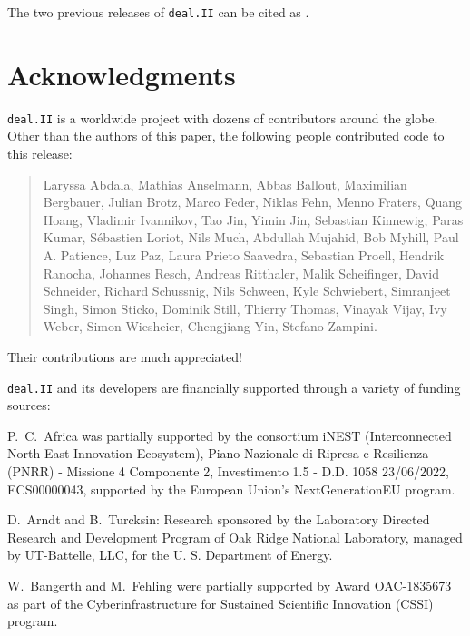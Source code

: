 \documentclass{ansarticle-preprint}
\newcommand{\specialword}[1]{\texttt{#1}}
\newcommand{\dealii}{{\specialword{deal.II}}\xspace}
\begin{document}
The two previous releases of \dealii can be cited as
\cite{dealII92,dealII93}.


\section{Acknowledgments}

\dealii is a worldwide project with dozens of contributors around the
globe. Other than the authors of this paper, the following people
contributed code to this release:\\

\begin{quote}
Laryssa      Abdala,
Mathias      Anselmann,
Abbas        Ballout,
Maximilian   Bergbauer,
Julian       Brotz,
Marco        Feder,
Niklas       Fehn,
Menno        Fraters,
Quang        Hoang,
Vladimir     Ivannikov,
Tao          Jin,
Yimin        Jin,
Sebastian    Kinnewig,
Paras        Kumar,
Sébastien    Loriot,
Nils         Much,
Abdullah     Mujahid,
Bob          Myhill,
Paul A.      Patience,
Luz          Paz,
Laura        Prieto Saavedra,
Sebastian    Proell,
Hendrik      Ranocha,
Johannes     Resch,
Andreas      Ritthaler,
Malik        Scheifinger,
David        Schneider,
Richard      Schussnig,
Nils         Schween,
Kyle         Schwiebert,
Simranjeet   Singh,
Simon        Sticko,
Dominik      Still,
Thierry      Thomas,
Vinayak      Vijay,
Ivy          Weber,
Simon        Wiesheier,
Chengjiang   Yin,
Stefano      Zampini.
\end{quote}
Their contributions are much appreciated!


\bigskip

\dealii and its developers are financially supported through a
variety of funding sources:

P.~C.~Africa was partially supported by the consortium iNEST (Interconnected North-East Innovation Ecosystem),
Piano Nazionale di Ripresa e Resilienza (PNRR) - Missione 4 Componente 2, Investimento 1.5 - D.D. 1058 23/06/2022,
ECS00000043, supported by the European Union's NextGenerationEU program.

D.~Arndt and B.~Turcksin: Research sponsored by the Laboratory Directed Research and
Development Program of Oak Ridge National Laboratory, managed by UT-Battelle,
LLC, for the U. S. Department of Energy.

W.~Bangerth and M.~Fehling were partially supported by Award OAC-1835673
as part of the Cyberinfrastructure for Sustained Scientific Innovation (CSSI)
program.
\end{document}
